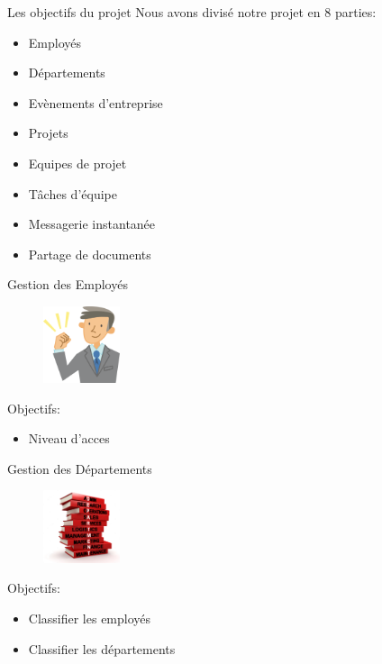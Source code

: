 \begin{frame}{Les objectifs du projet}
 Nous avons divisé notre projet en 8 parties:
  \begin{itemize}
  \item Employés
\item Départements
 \item Evènements d'entreprise
 \item Projets
 \item Equipes de projet
 \item Tâches d'équipe
  \item Messagerie instantanée
\item Partage de documents
    \end{itemize}
\end{frame}

\begin{frame}{Gestion des Employés}
\begin{figure}[h!]
  \includegraphics[width=0.2\textwidth]{images/employee}
\end{figure}
Objectifs:
  \begin{itemize}
    \item Niveau d'acces
  \end{itemize}
\end{frame}

\begin{frame}{Gestion des Départements}
\begin{figure}[h!]
  \includegraphics[width=0.2\textwidth]{images/department}
\end{figure}
Objectifs:
  \begin{itemize}
    \item Classifier les employés
    \item Classifier les départements
  \end{itemize}
\end{frame}

